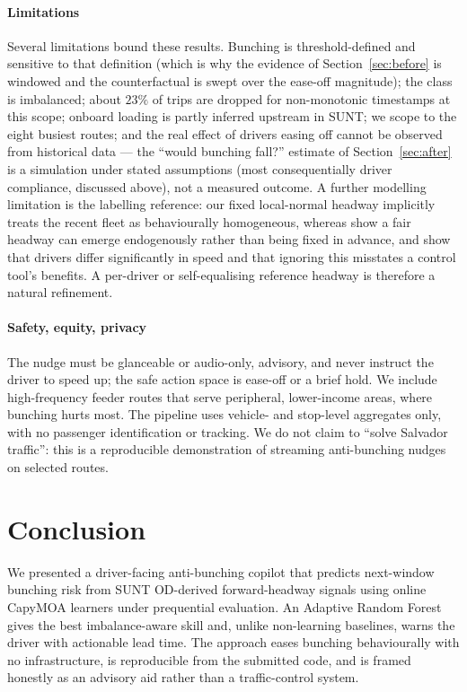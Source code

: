 \documentclass[final,5p,times,twocolumn,authoryear]{elsarticle}
\begin{document}
\paragraph{Limitations}
Several limitations bound these results. Bunching is threshold-defined and sensitive to that
definition (which is why the evidence of Section~\ref{sec:before} is windowed and the
counterfactual is swept over the ease-off magnitude); the class is imbalanced; about $23\%$ of trips
are dropped for non-monotonic timestamps at this scope; onboard loading is partly inferred upstream
in SUNT; we scope to the eight busiest routes; and the real effect of drivers easing off cannot be
observed from historical data --- the ``would bunching fall?'' estimate of Section~\ref{sec:after}
is a simulation under stated assumptions (most consequentially driver compliance, discussed above),
not a measured outcome. A further modelling limitation is the labelling reference: our fixed
local-normal headway implicitly treats the recent fleet as behaviourally homogeneous, whereas
\citet{Bartholdi2012} show a fair headway can emerge endogenously rather than being fixed in advance,
and \citet{MartinezEstupinan2023} show that drivers differ significantly in speed and that ignoring
this misstates a control tool's benefits. A per-driver or self-equalising reference headway is
therefore a natural refinement.

\paragraph{Safety, equity, privacy}
The nudge must be glanceable or audio-only, advisory, and never instruct the driver to speed up;
the safe action space is ease-off or a brief hold. We include high-frequency feeder routes that
serve peripheral, lower-income areas, where bunching hurts most. The pipeline uses vehicle- and
stop-level aggregates only, with no passenger identification or tracking. We do not claim to
``solve Salvador traffic'': this is a reproducible demonstration of streaming anti-bunching
nudges on selected routes.

\section{Conclusion}
\label{sec:conclusion}

We presented a driver-facing anti-bunching copilot that predicts next-window bunching risk from
SUNT OD-derived forward-headway signals using online CapyMOA learners under prequential
evaluation. An Adaptive Random Forest gives the best imbalance-aware skill and, unlike
non-learning baselines, warns the driver with actionable lead time. The approach eases bunching
behaviourally with no infrastructure, is reproducible from the submitted code, and is framed
honestly as an advisory aid rather than a traffic-control system.
\end{document}
